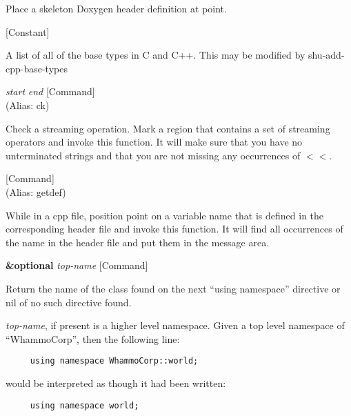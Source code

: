 \begin{doc-string}
Place a skeleton Doxygen header definition at point.
\end{doc-string}

\vspace{1em}
\noindent
{}
\usebox{\funcname}
 \hfill [Constant]

\begin{doc-string}
A list of all of the base types in C and C++.  This may be modified by shu-add-cpp-base-types
\end{doc-string}

\vspace{1em}
\noindent
{}
\usebox{\funcname}\emph{start} \emph{end}
 \hfill [Command]\\%
 (Alias: ck)

\begin{doc-string}
Check a streaming operation.   Mark a region that contains a set of streaming
operators and invoke this function.  It will make sure that you have no unterminated
strings and that you are not missing any occurrences of $<$$<$.
\end{doc-string}

\vspace{1em}
\noindent
{}
\usebox{\funcname}
 \hfill [Command]\\%
 (Alias: getdef)

\begin{doc-string}
While in a cpp file, position point on a variable name that is defined in the
corresponding header file and invoke this function.  It will find all occurrences of
the name in the header file and put them in the message area.
\end{doc-string}

\vspace{1em}
\noindent
{}
\usebox{\funcname}\textbf{\&optional} \emph{top-name}
 \hfill [Command]

\begin{doc-string}
Return the name of the class found on the next ``using namespace'' directive
or nil of no such directive found.

\emph{top-name}, if present is a higher level namespace.  Given a top level namespace
of ``WhammoCorp'', then the following line:

\small{\begin{verbatim}
     using namespace WhammoCorp::world;
\end{verbatim}}

would be interpreted as though it had been written:

\small{\begin{verbatim}
     using namespace world;
\end{verbatim}}
\end{doc-string}

